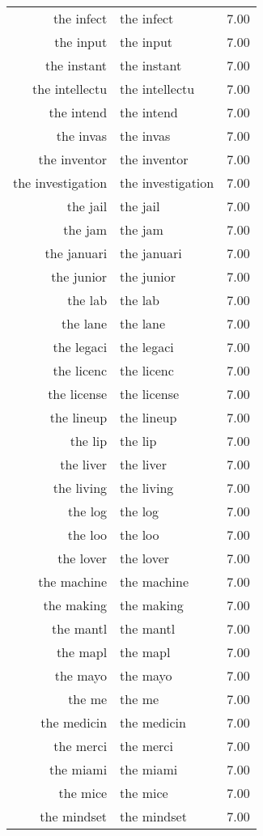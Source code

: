 \begin{table}[ht]
\begin{tabular}{rlr}
  the infect & the infect & 7.00 \\ 
  the input & the input & 7.00 \\ 
  the instant & the instant & 7.00 \\ 
  the intellectu & the intellectu & 7.00 \\ 
  the intend & the intend & 7.00 \\ 
  the invas & the invas & 7.00 \\ 
  the inventor & the inventor & 7.00 \\ 
  the investigation & the investigation & 7.00 \\ 
  the jail & the jail & 7.00 \\ 
  the jam & the jam & 7.00 \\ 
  the januari & the januari & 7.00 \\ 
  the junior & the junior & 7.00 \\ 
  the lab & the lab & 7.00 \\ 
  the lane & the lane & 7.00 \\ 
  the legaci & the legaci & 7.00 \\ 
  the licenc & the licenc & 7.00 \\ 
  the license & the license & 7.00 \\ 
  the lineup & the lineup & 7.00 \\ 
  the lip & the lip & 7.00 \\ 
  the liver & the liver & 7.00 \\ 
  the living & the living & 7.00 \\ 
  the log & the log & 7.00 \\ 
  the loo & the loo & 7.00 \\ 
  the lover & the lover & 7.00 \\ 
  the machine & the machine & 7.00 \\ 
  the making & the making & 7.00 \\ 
  the mantl & the mantl & 7.00 \\ 
  the mapl & the mapl & 7.00 \\ 
  the mayo & the mayo & 7.00 \\ 
  the me & the me & 7.00 \\ 
  the medicin & the medicin & 7.00 \\ 
  the merci & the merci & 7.00 \\ 
  the miami & the miami & 7.00 \\ 
  the mice & the mice & 7.00 \\ 
  the mindset & the mindset & 7.00 \\ 

\end{tabular}
\end{table}
